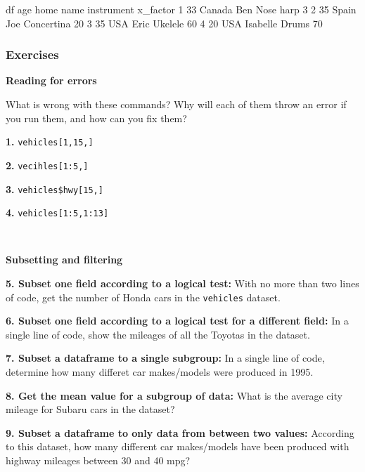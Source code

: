 \documentclass[]{book}
\newenvironment{Shaded}{\begin{snugshade}}{\end{snugshade}}
\newcommand{\DecValTok}[1]{\textcolor[rgb]{0.00,0.00,0.81}{#1}}
\newcommand{\NormalTok}[1]{#1}
\begin{document}
\begin{Shaded}
\begin{Highlighting}[]
\NormalTok{df}
\NormalTok{  age   home     name instrument x_factor}
\DecValTok{1}  \DecValTok{33}\NormalTok{ Canada      Ben  Nose harp        }\DecValTok{3}
\DecValTok{2}  \DecValTok{35}\NormalTok{  Spain      Joe Concertina       }\DecValTok{20}
\DecValTok{3}  \DecValTok{35}\NormalTok{    USA     Eric    Ukelele       }\DecValTok{60}
\DecValTok{4}  \DecValTok{20}\NormalTok{    USA Isabelle      Drums       }\DecValTok{70}
\end{Highlighting}
\end{Shaded}

\hypertarget{exercises-5}{%
\subsubsection*{Exercises}\label{exercises-5}}

\textbf{Reading for errors}

What is wrong with these commands? Why will each of them throw an error if you run them, and how can you fix them?

\textbf{1.} \texttt{vehicles{[}1,15,{]}}

\textbf{2.} \texttt{vecihles{[}1:5,{]}}

\textbf{3.} \texttt{vehicles\$hwy{[}15,{]}}

\textbf{4.} \texttt{vehicles{[}1:5,1:13{]}}

~

\textbf{Subsetting and filtering}

\textbf{5. Subset one field according to a logical test:} With no more than two lines of code, get the number of Honda cars in the \texttt{vehicles} dataset.

\textbf{6. Subset one field according to a logical test for a different field:} In a single line of code, show the mileages of all the Toyotas in the dataset.

\textbf{7. Subset a dataframe to a single subgroup:} In a single line of code, determine how many differet car makes/models were produced in 1995.

\textbf{8. Get the mean value for a subgroup of data:} What is the average city mileage for Subaru cars in the dataset?

\textbf{9. Subset a dataframe to only data from between two values:} According to this dataset, how many different car makes/models have been produced with highway mileages between 30 and 40 mpg?
\end{document}
